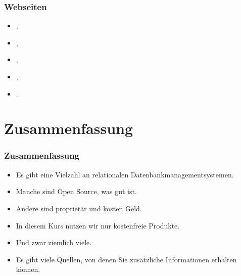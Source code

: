 \documentclass[aspectratio=169,mathserif,notheorems]{beamer}%
\begin{document}
%
\begin{frame}%
\frametitle{Webseiten}%
\begin{itemize}%
\item {},%
\item {},%
\item {},%
\item {},%
\item {}.%
\end{itemize}%
\end{frame}%
%
\section{Zusammenfassung}%
%
\begin{frame}%
\frametitle{Zusammenfassung}%
\begin{itemize}%
\item Es gibt eine Vielzahl an relationalen Datenbankmanagementsystemen.%
\item<2-> Manche sind Open Source, was gut ist.%
\item<3-> Andere sind proprietär und kosten Geld.%
\item<4-> In diesem Kurs nutzen wir nur kostenfreie Produkte.%
\item<5-> Und zwar ziemlich viele.%
\item<6-> Es gibt viele Quellen, von denen Sie zusätzliche Informationen erhalten können.%
\end{itemize}%
\end{frame}%
%
\endPresentation%
\end{document}
